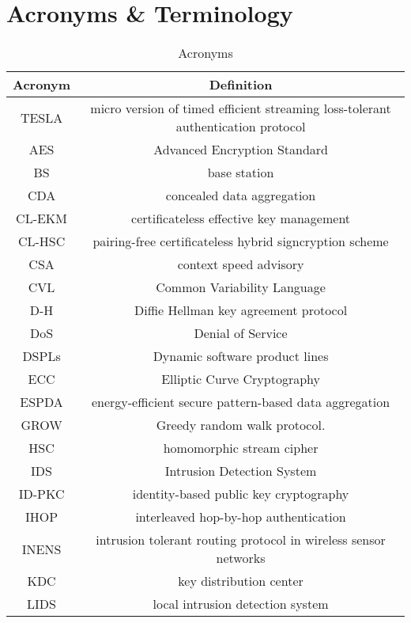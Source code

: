 \documentclass[12pt,a4paper,twoside]{report}
\begin{document}
\section{Acronyms \& Terminology}
\FloatBarrier
\begin{table}[H]
    \caption{Acronyms}
  	\begin{center}
    \begin{tabular}{|c|c|} \hline
	        Acronym & Definition \\ \hline\hline
	        \si{\micro}TESLA & micro version of timed efficient streaming loss-tolerant authentication protocol\\ \hline
	        AES & Advanced Encryption Standard \\ \hline
	        BS & base station \\ \hline
	        CDA & concealed data aggregation  \\ \hline
	        CL-EKM & certificateless effective key management \\ \hline
	        CL-HSC & pairing-free certificateless hybrid signcryption scheme \\ \hline
	        CSA & context speed advisory \\ \hline
	        CVL & Common Variability Language \\ \hline
	        D-H & Diffie Hellman key agreement protocol \\ \hline
	        DoS & Denial of Service \\ \hline
	        DSPLs & Dynamic software product lines \\ \hline
	        ECC & Elliptic Curve Cryptography  \\ \hline
	        ESPDA & energy-efficient secure pattern-based data aggregation \\ \hline
	        GROW & Greedy random walk protocol. \\ \hline
	        HSC & homomorphic stream cipher\\ \hline
	        IDS & Intrusion Detection System \\ \hline
	        ID-PKC & identity-based public key cryptography  \\ \hline
	        IHOP & interleaved hop-by-hop authentication \\ \hline
	        INENS & intrusion tolerant routing protocol in wireless sensor networks \\ \hline
	        KDC & key distribution center \\ \hline
	        LIDS & local intrusion detection system \\ \hline

\end{tabular}
\end{center}
\end{table}
\end{document}
